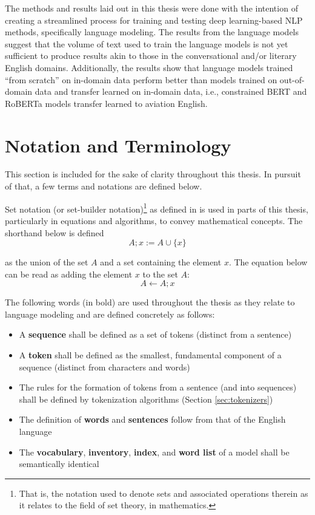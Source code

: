 \documentclass[12pt]{article}
\begin{document}
The methods and results laid out in this thesis were done with the intention of creating a streamlined process for training and testing deep
learning-based NLP methods, specifically language modeling. The results from the language models suggest that the volume of text used to train the
language models is not yet sufficient to produce results akin to those in the conversational and/or literary English domains. Additionally, the
results show that language models trained ``from scratch'' on in-domain data perform better than models trained on out-of-domain data and transfer
learned on in-domain data, i.e., constrained BERT and RoBERTa models transfer learned to aviation English.

\section{Notation and Terminology}
This section is included for the sake of clarity throughout this thesis. In pursuit of that, a few terms and notations are defined below.

Set notation (or set-builder notation)\footnote{That is, the notation used to denote sets and associated operations therein as it relates to the field
    of set theory, in mathematics.} as defined in \cite{jech_chapter_1978} is used in parts of this thesis, particularly in equations and algorithms, to
convey mathematical concepts. The shorthand below is defined
\begin{equation*}
    A; x := A \cup \{x\}
\end{equation*}

\noindent
as the union of the set $A$ and a set containing the element $x$. The equation below can be read as adding the element $x$ to the set $A$:
\begin{equation*}
    A \leftarrow A; x
\end{equation*}

The following words (in bold) are used throughout the thesis as they relate to language modeling and are defined concretely as follows:
\begin{itemize}
    \item A \textbf{sequence} shall be defined as a set of tokens (distinct from a sentence)
    \item A \textbf{token} shall be defined as the smallest, fundamental component of a sequence (distinct from characters and words)
    \item The rules for the formation of tokens from a sentence (and into sequences) shall be defined by tokenization algorithms (Section
          \ref{sec:tokenizers})
    \item The definition of \textbf{words} and \textbf{sentences} follow from that of the English language
    \item The \textbf{vocabulary}, \textbf{inventory}, \textbf{index}, and \textbf{word list} of a model shall be semantically identical
\end{itemize}
\end{document}
